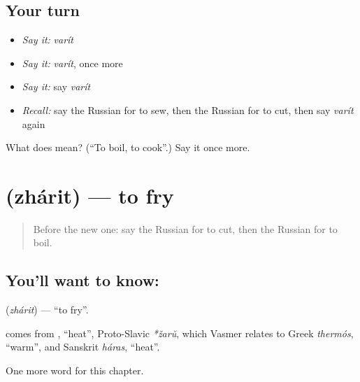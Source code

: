 \subsection*{Your turn}
\begin{itemize}
\raggedright
  \item \emph{Say it:} \emph{varít}
  \item \emph{Say it:} \emph{varít}, once more
  \item \emph{Say it:} say \emph{varít}
  \item \emph{Recall:} say the Russian for to sew, then the Russian for to cut, then say \emph{varít} again
\end{itemize}

\begin{tcolorbox}[breakable,colback=teal!4,colframe=teal!35!black,title={Before you move on}]
What does  mean? (\textquotedblleft{}To boil, to cook\textquotedblright{}.) Say it once more.
\end{tcolorbox}
\section[\texorpdfstring{\ru{жарить} (zhárit)}{жарить (zhárit)}]{ (zhárit) — to fry}

\label{lesson:RU-C173-zharit}



\begin{quote}
Before the new one: say the Russian for to cut, then the Russian for to boil.
\end{quote}

\subsection*{You'll want to know: }
\textbf{} (\emph{zhárit}) — \textquotedblleft{}to fry\textquotedblright{}.

\begin{cousinweb}
\textbf{} comes from \emph{}, \textquotedblleft{}heat\textquotedblright{}, Proto-Slavic \emph{*žarŭ}, which Vasmer relates to Greek \emph{thermós}, \textquotedblleft{}warm\textquotedblright{}, and Sanskrit \emph{háras}, \textquotedblleft{}heat\textquotedblright{}.
\end{cousinweb}

\begin{grammarlens}[title={What you've built}]
One more word for this chapter.
\end{grammarlens}

